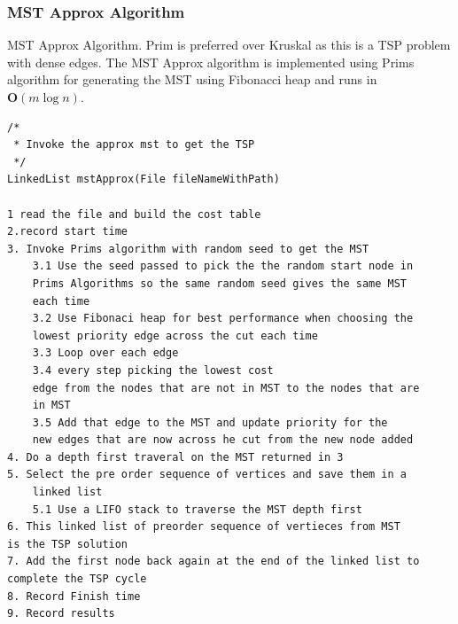 \documentclass[twoside,11pt]{article}
\begin{document}
\subsubsection{MST Approx Algorithm}
MST Approx Algorithm. Prim is preferred over Kruskal as this is a TSP problem with dense edges. The MST Approx algorithm is implemented using Prims algorithm for generating the MST using Fibonacci heap and runs in $\mathbf{O}(m\log n)$.
\begin{lstlisting}
/*
 * Invoke the approx mst to get the TSP
 */
LinkedList mstApprox(File fileNameWithPath) 

1 read the file and build the cost table
2.record start time 
3. Invoke Prims algorithm with random seed to get the MST
	3.1 Use the seed passed to pick the the random start node in 
	Prims Algorithms so the same random seed gives the same MST 
	each time
	3.2 Use Fibonaci heap for best performance when choosing the
	lowest priority edge across the cut each time 
	3.3 Loop over each edge 
	3.4 every step picking the lowest cost 
	edge from the nodes that are not in MST to the nodes that are
	in MST 
	3.5 Add that edge to the MST and update priority for the 
	new edges that are now across he cut from the new node added 
4. Do a depth first traveral on the MST returned in 3
5. Select the pre order sequence of vertices and save them in a 
	linked list
	5.1 Use a LIFO stack to traverse the MST depth first
6. This linked list of preorder sequence of vertieces from MST
is the TSP solution
7. Add the first node back again at the end of the linked list to 
complete the TSP cycle
8. Record Finish time
9. Record results
\end{lstlisting}
\end{document}
